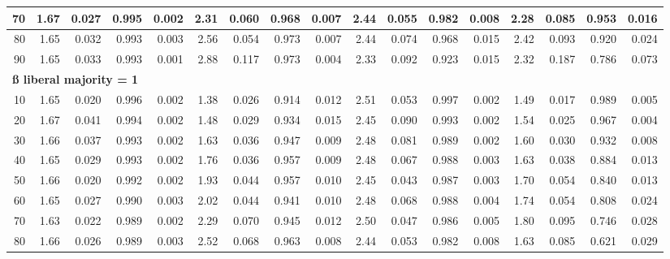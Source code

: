 \documentclass[
]{article}
\begin{document}
\begin{table}[H]
{\begin{tabular}{r|r|r|r|r|r|r|r|r|r|r|r|r|r|r|r|r}
\hline
\hspace{1em}70 & 1.67 & 0.027 & 0.995 & 0.002 & 2.31 & 0.060 & 0.968 & 0.007 & 2.44 & 0.055 & 0.982 & 0.008 & 2.28 & 0.085 & 0.953 & 0.016\\
\hline
\hspace{1em}80 & 1.65 & 0.032 & 0.993 & 0.003 & 2.56 & 0.054 & 0.973 & 0.007 & 2.44 & 0.074 & 0.968 & 0.015 & 2.42 & 0.093 & 0.920 & 0.024\\
\hline
\hspace{1em}90 & 1.65 & 0.033 & 0.993 & 0.001 & 2.88 & 0.117 & 0.973 & 0.004 & 2.33 & 0.092 & 0.923 & 0.015 & 2.32 & 0.187 & 0.786 & 0.073\\
\hline
\multicolumn{17}{l}{\textbf{ß liberal majority = 1}}\\
\hline
\hspace{1em}10 & 1.65 & 0.020 & 0.996 & 0.002 & 1.38 & 0.026 & 0.914 & 0.012 & 2.51 & 0.053 & 0.997 & 0.002 & 1.49 & 0.017 & 0.989 & 0.005\\
\hline
\hspace{1em}20 & 1.67 & 0.041 & 0.994 & 0.002 & 1.48 & 0.029 & 0.934 & 0.015 & 2.45 & 0.090 & 0.993 & 0.002 & 1.54 & 0.025 & 0.967 & 0.004\\
\hline
\hspace{1em}30 & 1.66 & 0.037 & 0.993 & 0.002 & 1.63 & 0.036 & 0.947 & 0.009 & 2.48 & 0.081 & 0.989 & 0.002 & 1.60 & 0.030 & 0.932 & 0.008\\
\hline
\hspace{1em}40 & 1.65 & 0.029 & 0.993 & 0.002 & 1.76 & 0.036 & 0.957 & 0.009 & 2.48 & 0.067 & 0.988 & 0.003 & 1.63 & 0.038 & 0.884 & 0.013\\
\hline
\hspace{1em}50 & 1.66 & 0.020 & 0.992 & 0.002 & 1.93 & 0.044 & 0.957 & 0.010 & 2.45 & 0.043 & 0.987 & 0.003 & 1.70 & 0.054 & 0.840 & 0.013\\
\hline
\hspace{1em}60 & 1.65 & 0.027 & 0.990 & 0.003 & 2.02 & 0.044 & 0.941 & 0.010 & 2.48 & 0.068 & 0.988 & 0.004 & 1.74 & 0.054 & 0.808 & 0.024\\
\hline
\hspace{1em}70 & 1.63 & 0.022 & 0.989 & 0.002 & 2.29 & 0.070 & 0.945 & 0.012 & 2.50 & 0.047 & 0.986 & 0.005 & 1.80 & 0.095 & 0.746 & 0.028\\
\hline
\hspace{1em}80 & 1.66 & 0.026 & 0.989 & 0.003 & 2.52 & 0.068 & 0.963 & 0.008 & 2.44 & 0.053 & 0.982 & 0.008 & 1.63 & 0.085 & 0.621 & 0.029\\

\end{tabular}}
\end{table}
\end{document}
